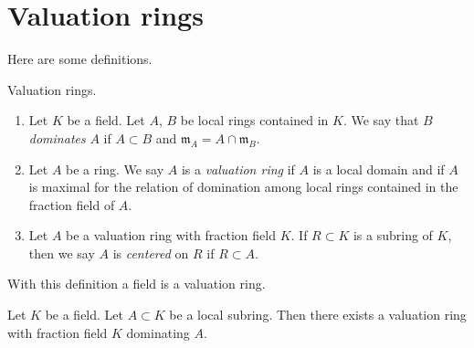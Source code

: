 \section{Valuation rings}
\label{section-valuation-rings}

\noindent
Here are some definitions.

\begin{definition}
\label{definition-valuation-ring}
Valuation rings.
\begin{enumerate}
\item Let $K$ be a field. Let $A$, $B$ be local rings contained
in $K$. We say that $B$ {\it dominates} $A$ if $A \subset B$
and $\mathfrak m_A = A \cap \mathfrak m_B$.
\item Let $A$ be a ring. We say $A$ is a {\it valuation ring}
if $A$ is a local domain and if $A$ is maximal
for the relation of domination among local rings contained in
the fraction field of $A$.
\item Let $A$ be a valuation ring with fraction field $K$.
If $R \subset K$ is a subring of $K$, then we say $A$
is {\it centered} on $R$ if $R \subset A$.
\end{enumerate}
\end{definition}

\noindent
With this definition a field is a valuation ring.

\begin{lemma}
\label{lemma-dominate}
Let $K$ be a field. Let $A \subset K$ be a local subring.
Then there exists a valuation ring with fraction field $K$
dominating $A$.
\end{lemma}

